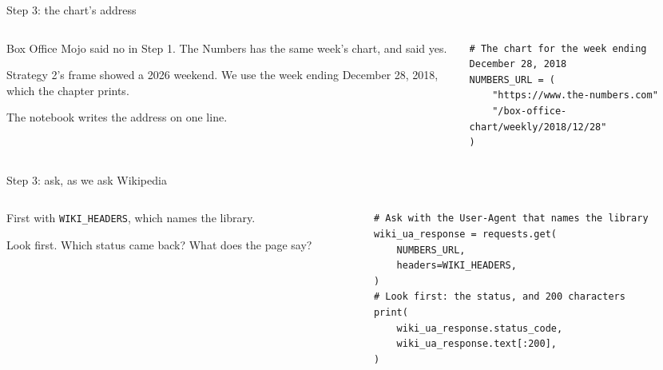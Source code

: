 \documentclass[9pt,aspectratio=169]{beamer}
\begin{document}
\begin{frame}[fragile]{Step 3: the chart's address}
    \begin{columns}[T]
        \begin{column}{0.37\textwidth}
            Box Office Mojo said no in Step 1. The Numbers has the same week's chart, and said yes.

            \medskip
            Strategy 2's frame showed a 2026 weekend. We use the week ending December 28, 2018, which the chapter prints.

            \medskip
            The notebook writes the address on one line.
        \end{column}
        \begin{column}{0.6\textwidth}
\begin{lstlisting}
# The chart for the week ending December 28, 2018
NUMBERS_URL = (
    "https://www.the-numbers.com"
    "/box-office-chart/weekly/2018/12/28"
)
\end{lstlisting}
        \end{column}
    \end{columns}
\end{frame}

\begin{frame}[fragile]{Step 3: ask, as we ask Wikipedia}
    \begin{columns}[T]
        \begin{column}{0.37\textwidth}
            First with \texttt{WIKI\_HEADERS}, which names the library.

            \medskip
            Look first. Which status came back? What does the page say?
        \end{column}
        \begin{column}{0.6\textwidth}
\begin{lstlisting}
# Ask with the User-Agent that names the library
wiki_ua_response = requests.get(
    NUMBERS_URL,
    headers=WIKI_HEADERS,
)
# Look first: the status, and 200 characters
print(
    wiki_ua_response.status_code,
    wiki_ua_response.text[:200],
)
\end{lstlisting}
        \end{column}
    \end{columns}
\end{frame}
\end{document}
